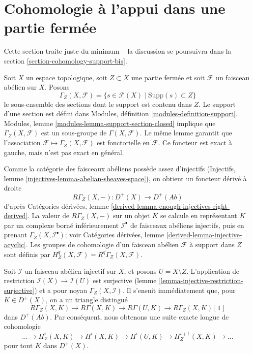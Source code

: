 \section{Cohomologie à l'appui dans une partie fermée}

\label{section-cohomology-support}

\noindent
Cette section traite juste du minimum -- la discussion se poursuivra dans la section \ref{section-cohomology-support-bis}.

\medskip\noindent
Soit $X$ un espace topologique, soit $Z \subset X$ une partie fermée et soit $\mathcal{F}$ un faisceau abélien sur $X$. Posons $$
\Gamma_Z(X, \mathcal{F}) =
\{s \in \mathcal{F}(X) \mid \text{Supp}(s) \subset Z\}
$$ le sous-ensemble des sections dont le support est contenu dans $Z$. Le support d'une section est défini dans Modules, définition \ref{modules-definition-support}. Modules, lemme \ref{modules-lemma-support-section-closed} implique que $\Gamma_Z(X, \mathcal{F})$ est un sous-groupe de $\Gamma(X, \mathcal{F})$. Le même lemme garantit que l'association $\mathcal{F} \mapsto \Gamma_Z(X, \mathcal{F})$ est fonctorielle en $\mathcal{F}$. Ce foncteur est exact à gauche, mais n'est pas exact en général.

\medskip\noindent

Comme la catégorie des faisceaux abéliens possède assez d'injectifs (Injectifs, lemme \ref{injectives-lemma-abelian-sheaves-space}), on obtient un foncteur dérivé à droite
$$
R\Gamma_Z(X, -) : D^+(X) \longrightarrow D^+(\textit{Ab})
$$
d'après Catégories dérivées, lemme \ref{derived-lemma-enough-injectives-right-derived}. La valeur de $R\Gamma_Z(X, -)$ sur un objet $K$ se calcule en représentant
$K$ par un complexe borné inférieurement $\mathcal{I}^\bullet$ de faisceaux abéliens injectifs, puis en prenant $\Gamma_Z(X, \mathcal{I}^\bullet)$; voir Catégories dérivées, lemme \ref{derived-lemma-injective-acyclic}. Les groupes de cohomologie d'un faisceau abélien $\mathcal{F}$
à support dans $Z$ sont définis par
$H^q_Z(X, \mathcal{F}) = R^q\Gamma_Z(X, \mathcal{F})$.

\medskip\noindent
Soit $\mathcal{I}$ un faisceau abélien injectif sur $X$, et posons $U = X \setminus Z$. L'application de restriction $\mathcal{I}(X) \to \mathcal{I}(U)$ est surjective (lemme \ref{lemma-injective-restriction-surjective}) et a pour noyau $\Gamma_Z(X, \mathcal{I})$. Il s'ensuit immédiatement que, pour $K \in D^+(X)$, on a un triangle distingué $$
R\Gamma_Z(X, K) \to R\Gamma(X, K) \to R\Gamma(U, K) \to R\Gamma_Z(X, K)[1]
$$ dans $D^+(\textit{Ab})$. Par conséquent, nous obtenons une suite exacte longue de cohomologie $$
\ldots \to H^i_Z(X, K) \to H^i(X, K) \to H^i(U, K) \to
H^{i + 1}_Z(X, K) \to \ldots
$$ pour tout $K$ dans $D^+(X)$.


